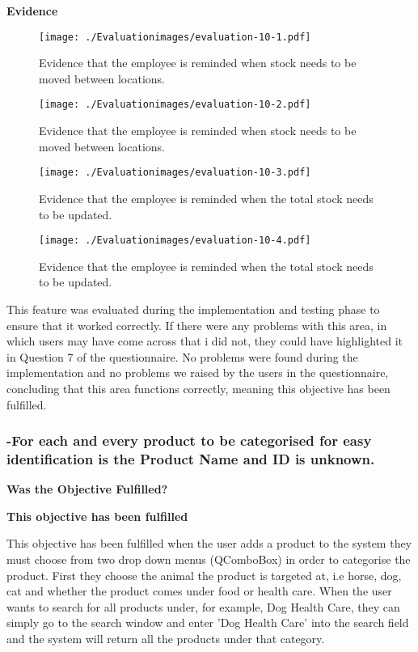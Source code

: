 \textbf{Evidence} \newline

\begin{figure}[H]
\caption{Evidence that the employee is reminded when stock needs to be moved between locations.} \label{fig:evaluation-10-1}
\hfill\texttt{[image: ./Evaluationimages/evaluation-10-1.pdf]}
\end{figure}

\begin{figure}[H]
\caption{Evidence that the employee is reminded when stock needs to be moved between locations.} \label{fig:evaluation-10-2}
\hfill\texttt{[image: ./Evaluationimages/evaluation-10-2.pdf]}
\end{figure}

\begin{figure}[H]
\caption{Evidence that the employee is reminded when the total stock needs to be updated.} \label{fig:evaluation-10-3}
\hfill\texttt{[image: ./Evaluationimages/evaluation-10-3.pdf]}
\end{figure}

\begin{figure}[H]
\caption{Evidence that the employee is reminded when the total stock needs to be updated.} \label{fig:evaluation-10-4}
\hfill\texttt{[image: ./Evaluationimages/evaluation-10-4.pdf]}
\end{figure}

This feature was evaluated during the implementation and testing phase to ensure that it worked correctly. If there were any problems with this area, in which users may have come across that i did not, they could have highlighted it in Question 7 of the questionnaire. No problems were found during the implementation and no problems we raised by the users in the questionnaire, concluding that this area functions correctly, meaning this objective has been fulfilled.


\pagebreak
\subsubsection{-For each and every product to be categorised for easy identification is the Product Name and ID is unknown.}
\textbf{Was the Objective Fulfilled?} \newline

\textbf{\large{This objective has been fulfilled}}

This objective has been fulfilled when the user adds a product to the system they must choose from two drop down menus (QComboBox) in order to categorise the product. First they choose the animal the product is targeted at, i.e horse, dog, cat and whether the product comes under food or health care. When the user wants to search for all products under, for example, Dog Health Care, they can simply go to the search window and enter 'Dog Health Care' into the search field and the system will return all the products under that category.

